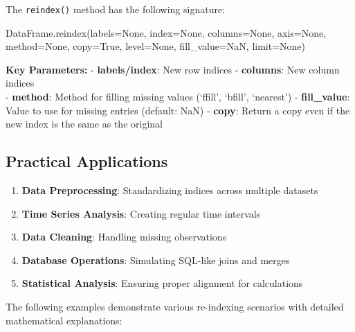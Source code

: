 \documentclass[11pt]{article}
\providecommand{\tightlist}{%
      \setlength{\itemsep}{0pt}\setlength{\parskip}{0pt}}
\newenvironment{Shaded}{}{}
\newcommand{\NormalTok}[1]{{#1}}
\newcommand{\VariableTok}[1]{\textcolor[rgb]{0.10,0.09,0.49}{{#1}}}
\newcommand{\OperatorTok}[1]{\textcolor[rgb]{0.40,0.40,0.40}{{#1}}}
\begin{document}
The \texttt{reindex()} method has the following signature:

\begin{Shaded}
\begin{Highlighting}[]
\NormalTok{DataFrame.reindex(labels}\OperatorTok{=}\VariableTok{None}\NormalTok{, index}\OperatorTok{=}\VariableTok{None}\NormalTok{, columns}\OperatorTok{=}\VariableTok{None}\NormalTok{, axis}\OperatorTok{=}\VariableTok{None}\NormalTok{, }
\NormalTok{                  method}\OperatorTok{=}\VariableTok{None}\NormalTok{, copy}\OperatorTok{=}\VariableTok{True}\NormalTok{, level}\OperatorTok{=}\VariableTok{None}\NormalTok{, fill\_value}\OperatorTok{=}\NormalTok{NaN, limit}\OperatorTok{=}\VariableTok{None}\NormalTok{)}
\end{Highlighting}
\end{Shaded}

\textbf{Key Parameters:} - \textbf{labels/index}: New row indices -
\textbf{columns}: New column indices\\
- \textbf{method}: Method for filling missing values (`ffill', `bfill',
`nearest') - \textbf{fill\_value}: Value to use for missing entries
(default: NaN) - \textbf{copy}: Return a copy even if the new index is
the same as the original

\subsection{Practical Applications}\label{practical-applications}

\begin{enumerate}
\def\labelenumi{\arabic{enumi}.}
\tightlist
\item
  \textbf{Data Preprocessing}: Standardizing indices across multiple
  datasets
\item
  \textbf{Time Series Analysis}: Creating regular time intervals
\item
  \textbf{Data Cleaning}: Handling missing observations
\item
  \textbf{Database Operations}: Simulating SQL-like joins and merges
\item
  \textbf{Statistical Analysis}: Ensuring proper alignment for
  calculations
\end{enumerate}

The following examples demonstrate various re-indexing scenarios with
detailed mathematical explanations:
\end{document}
